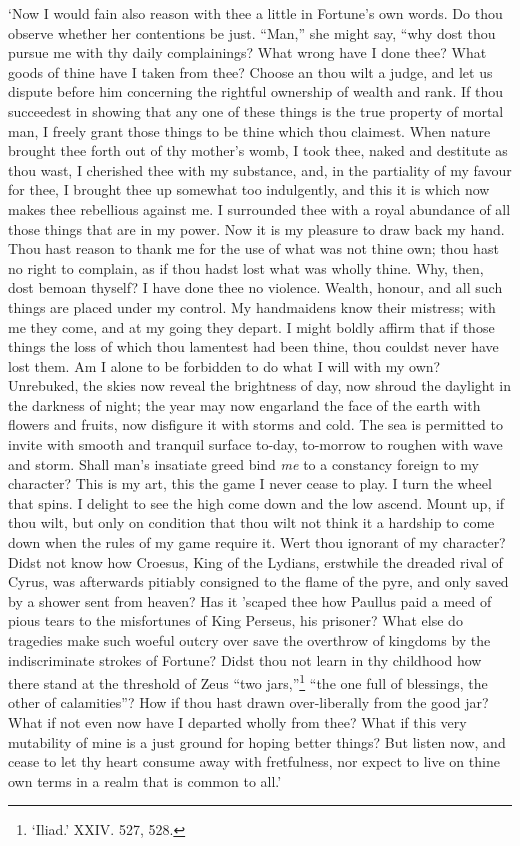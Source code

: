 \documentclass[11pt]{book}
\begin{document}
`Now I would fain also reason with thee a little in Fortune's own words.
Do thou observe whether her contentions be just. ``Man,'' she might say,
``why dost thou pursue me with thy daily complainings? What wrong have I
done thee? What goods of thine have I taken from thee? Choose an thou
wilt a judge, and let us dispute before him concerning the rightful
ownership of wealth and rank. If thou succeedest in showing that any one
of these things is the true property of mortal man, I freely grant those
things to be thine which thou claimest. When nature brought thee forth
out of thy mother's womb, I took thee, naked and destitute as thou wast,
I cherished thee with my substance, and, in the partiality of my favour
for thee, I brought thee up somewhat too indulgently, and this it is
which now makes thee rebellious against me. I surrounded thee with a
royal abundance of all those things that are in my power. Now it is my
pleasure to draw back my hand. Thou hast reason to thank me for the use
of what was not thine own; thou hast no right to complain, as if thou
hadst lost what was wholly thine. Why, then, dost bemoan thyself? I have
done thee no violence. Wealth, honour, and all such things are placed
under my control. My handmaidens know their mistress; with me they come,
and at my going they depart. I might boldly affirm that if those things
the loss of which thou lamentest had been thine, thou couldst never have
lost them. Am I alone to be forbidden to do what I will with my own?
Unrebuked, the skies now reveal the brightness of day, now shroud the
daylight in the darkness of night; the year may now engarland the face
of the earth with flowers and fruits, now disfigure it with storms and
cold. The sea is permitted to invite with smooth and tranquil surface
to-day, to-morrow to roughen with wave and storm. Shall man's insatiate
greed bind \emph{me} to a constancy foreign to my character? This is my art,
this the game I never cease to play. I turn the wheel that spins. I
delight to see the high come down and the low ascend. Mount up, if thou
wilt, but only on condition that thou wilt not think it a hardship to
come down when the rules of my game require it. Wert thou ignorant of my
character? Didst not know how Croesus, King of the Lydians, erstwhile
the dreaded rival of Cyrus, was afterwards pitiably consigned to the
flame of the pyre, and only saved by a shower sent from heaven? Has it
'scaped thee how Paullus paid a meed of pious tears to the misfortunes
of King Perseus, his prisoner? What else do tragedies make such woeful
outcry over save the overthrow of kingdoms by the indiscriminate strokes
of Fortune? Didst thou not learn in thy childhood how there stand at the
threshold of Zeus ``two jars,''\footnote{‘Iliad.’ XXIV. 527, 528.}
``the one full of blessings, the other of
calamities''? How if thou hast drawn over-liberally from the good jar?
What if not even now have I departed wholly from thee? What if this very
mutability of mine is a just ground for hoping better things? But listen
now, and cease to let thy heart consume away with fretfulness, nor
expect to live on thine own terms in a realm that is common to all.'
\end{document}
